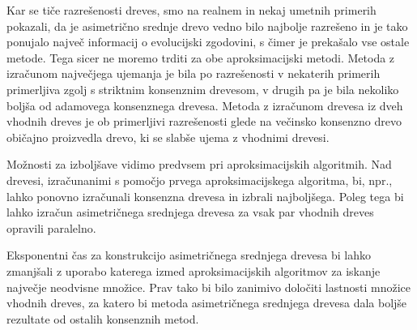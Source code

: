 \documentclass[a4paper, 12pt]{book}
\begin{document}
Kar se tiče razrešenosti dreves, smo na realnem in nekaj umetnih primerih pokazali, da 
je asimetrično srednje drevo vedno bilo najbolje razrešeno in je tako ponujalo največ 
informacij o evolucijski zgodovini, s čimer je prekašalo vse ostale metode. 
Tega sicer ne moremo trditi za obe aproksimacijski metodi. Metoda z izračunom 
največjega ujemanja je bila po razrešenosti v nekaterih primerih primerljiva zgolj 
s striktnim konsenznim drevesom, v drugih pa je bila nekoliko boljša od adamovega 
konsenznega drevesa. Metoda z izračunom drevesa iz dveh vhodnih dreves je ob 
primerljivi razrešenosti glede na večinsko konsenzno drevo običajno proizvedla drevo,
ki se slabše ujema z vhodnimi drevesi. 

Možnosti za izboljšave vidimo predvsem pri aproksimacijskih algoritmih. Nad drevesi,
izračunanimi s pomočjo prvega aproksimacijskega algoritma, bi, npr., lahko ponovno 
izračunali konsenzna drevesa in izbrali najboljšega. Poleg tega bi lahko
izračun asimetričnega srednjega drevesa za vsak par vhodnih dreves opravili paralelno. 

Eksponentni čas za konstrukcijo asimetričnega srednjega drevesa bi lahko zmanjšali z 
uporabo katerega izmed aproksimacijskih algoritmov za iskanje največje neodvisne množice.
Prav tako bi bilo zanimivo določiti lastnosti množice vhodnih dreves, za katero bi 
metoda asimetričnega srednjega drevesa dala boljše rezultate od ostalih konsenznih metod.
\end{document}
